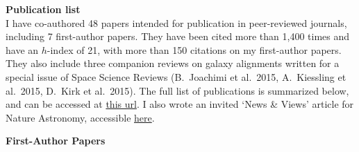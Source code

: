 \documentclass{article}
\begin{document}
% 

\noindent
{\bf\huge Publication list}\\

\noindent
I have co-authored 48 papers intended for publication in peer-reviewed journals, 
including 7 first-author papers. They have been cited more than 1,400 times and 
have an $h$-index of 21, with more than 150 citations on my first-author papers. 
They also include three companion reviews on galaxy alignments written for a 
special issue of Space Science Reviews (B.\ Joachimi et al.\ 2015, A.\ Kiessling 
et al.\ 2015, D.\ Kirk et al.\ 2015). The full list of publications is summarized 
below, and can be accessed at \href{https://goo.gl/LAu9G4}{this url}. I also wrote 
an invited `News \& Views' article for Nature Astronomy, accessible
\href{https://www.nature.com/articles/s41550-017-0181}{here}.


\vspace{0.4cm}
\noindent
{\bf\Large First-Author Papers}\\

\newcommand{\etal}[1]{et al.\ (#1 co-authors),}
\end{document}
